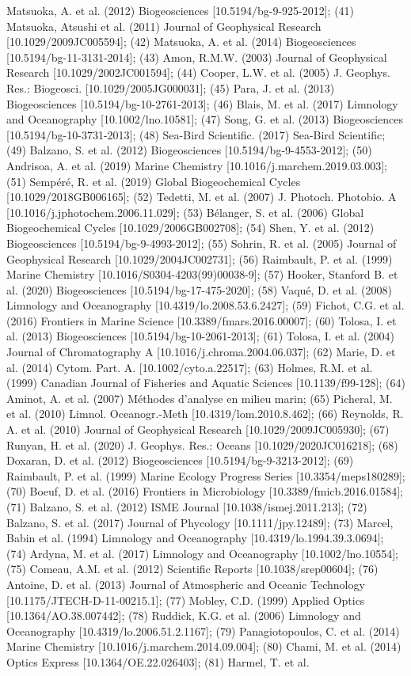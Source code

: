 \begin{ThreePartTable}
\begin{TableNotes}
Matsuoka, A. et al. (2012) Biogeosciences [10.5194/bg-9-925-2012]; (41) Matsuoka, Atsushi et al. (2011) Journal of Geophysical Research [10.1029/2009JC005594]; (42) Matsuoka, A. et al. (2014) Biogeosciences [10.5194/bg-11-3131-2014]; (43) Amon, R.M.W. (2003) Journal of Geophysical Research [10.1029/2002JC001594]; (44) Cooper, L.W. et al. (2005) J. Geophys. Res.: Biogeosci. [10.1029/2005JG000031]; (45) Para, J. et al. (2013) Biogeosciences [10.5194/bg-10-2761-2013]; (46) Blais, M. et al. (2017) Limnology and Oceanography [10.1002/lno.10581]; (47) Song, G. et al. (2013) Biogeosciences [10.5194/bg-10-3731-2013]; (48) Sea-Bird Scientific. (2017) Sea-Bird Scientific; (49) Balzano, S. et al. (2012) Biogeosciences [10.5194/bg-9-4553-2012]; (50) Andrisoa, A. et al. (2019) Marine Chemistry [10.1016/j.marchem.2019.03.003]; (51) Sempéré, R. et al. (2019) Global Biogeochemical Cycles [10.1029/2018GB006165]; (52) Tedetti, M. et al. (2007) J. Photoch. Photobio. A [10.1016/j.jphotochem.2006.11.029]; (53) Bélanger, S. et al. (2006) Global Biogeochemical Cycles [10.1029/2006GB002708]; (54) Shen, Y. et al. (2012) Biogeosciences [10.5194/bg-9-4993-2012]; (55) Sohrin, R. et al. (2005) Journal of Geophysical Research [10.1029/2004JC002731]; (56) Raimbault, P. et al. (1999) Marine Chemistry [10.1016/S0304-4203(99)00038-9]; (57) Hooker, Stanford B. et al. (2020) Biogeosciences [10.5194/bg-17-475-2020]; (58) Vaqué, D. et al. (2008) Limnology and Oceanography [10.4319/lo.2008.53.6.2427]; (59) Fichot, C.G. et al. (2016) Frontiers in Marine Science [10.3389/fmars.2016.00007]; (60) Tolosa, I. et al. (2013) Biogeosciences [10.5194/bg-10-2061-2013]; (61) Tolosa, I. et al. (2004) Journal of Chromatography A [10.1016/j.chroma.2004.06.037]; (62) Marie, D. et al. (2014) Cytom. Part. A. [10.1002/cyto.a.22517]; (63) Holmes, R.M. et al. (1999) Canadian Journal of Fisheries and Aquatic Sciences [10.1139/f99-128]; (64) Aminot, A. et al. (2007) Méthodes d'analyse en milieu marin; (65) Picheral, M. et al. (2010) Limnol. Oceanogr.-Meth [10.4319/lom.2010.8.462]; (66) Reynolds, R. A. et al. (2010) Journal of Geophysical Research [10.1029/2009JC005930]; (67) Runyan, H. et al. (2020) J. Geophys. Res.: Oceans [10.1029/2020JC016218]; (68) Doxaran, D. et al. (2012) Biogeosciences [10.5194/bg-9-3213-2012]; (69) Raimbault, P. et al. (1999) Marine Ecology Progress Series [10.3354/meps180289]; (70) Boeuf, D. et al. (2016) Frontiers in Microbiology [10.3389/fmicb.2016.01584]; (71) Balzano, S. et al. (2012) ISME Journal [10.1038/ismej.2011.213]; (72) Balzano, S. et al. (2017) Journal of Phycology [10.1111/jpy.12489]; (73) Marcel, Babin et al. (1994) Limnology and Oceanography [10.4319/lo.1994.39.3.0694]; (74) Ardyna, M. et al. (2017) Limnology and Oceanography [10.1002/lno.10554]; (75) Comeau, A.M. et al. (2012) Scientific Reports [10.1038/srep00604]; (76) Antoine, D. et al. (2013) Journal of Atmospheric and Oceanic Technology [10.1175/JTECH-D-11-00215.1]; (77) Mobley, C.D. (1999) Applied Optics [10.1364/AO.38.007442]; (78) Ruddick, K.G. et al. (2006) Limnology and Oceanography [10.4319/lo.2006.51.2.1167]; (79) Panagiotopoulos, C. et al. (2014) Marine Chemistry [10.1016/j.marchem.2014.09.004]; (80) Chami, M. et al. (2014) Optics Express [10.1364/OE.22.026403]; (81) Harmel, T. et al. 
\end{TableNotes}
\end{ThreePartTable}
